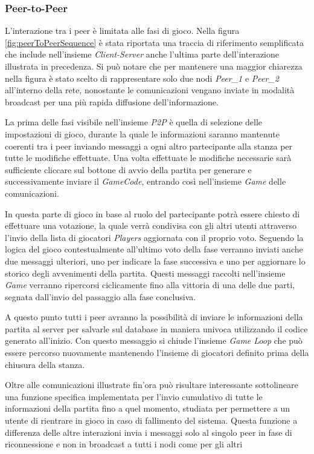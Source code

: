 \subsubsection{Peer-to-Peer}
L'interazione tra i peer è limitata alle fasi di gioco. Nella figura \ref{fig:peerToPeerSequence} è stata riportata una traccia di riferimento semplificata che include nell'insieme \emph{Client-Server} anche l'ultima parte dell'interazione illustrata in precedenza. Si può notare che per mantenere una maggior chiarezza nella figura è stato scelto di rappresentare solo due nodi \emph{Peer\_1} e \emph{Peer\_2} all'interno della rete, nonostante le comunicazioni vengano inviate in modalità broadcast per una più rapida diffusione dell'informazione.

 La prima delle fasi visibile nell'insieme \emph{P2P} è quella di selezione delle impostazioni di gioco, durante la quale le informazioni saranno mantenute coerenti tra i peer inviando messaggi a ogni altro partecipante alla stanza per tutte le modifiche effettuate. Una volta effettuate le modifiche necessarie sarà sufficiente cliccare sul bottone di avvio della partita per generare e successivamente inviare il \emph{GameCode}, entrando così nell'insieme \emph{Game} delle comunicazioni.

 In questa parte di gioco in base al ruolo del partecipante potrà essere chiesto di effettuare una votazione, la quale verrà condivisa con gli altri utenti attraverso l'invio della lista di giocatori \emph{Players} aggiornata con il proprio voto. Seguendo la logica del gioco contestualmente all'ultimo voto della fase verranno inviati anche due messaggi ulteriori, uno per indicare la fase successiva e uno per aggiornare lo storico degli avvenimenti della partita. Questi messaggi raccolti nell'insieme \emph{Game} verranno ripercorsi ciclicamente fino alla vittoria di una delle due parti, segnata dall'invio del passaggio alla fase conclusiva.

 A questo punto tutti i peer avranno la possibilità di inviare le informazioni della partita al server per salvarle sul database in maniera univoca utilizzando il codice generato all'inizio. 
 Con questo messaggio si chiude l'insieme \emph{Game Loop} che può essere percorso nuovamente mantenendo l'insieme di giocatori definito prima della chiusura della stanza.

 Oltre alle comunicazioni illustrate fin'ora può risultare interessante sottolineare una funzione specifica implementata per l'invio cumulativo di tutte le informazioni della partita fino a quel momento, studiata per permettere a un utente di rientrare in gioco in caso di fallimento del sistema. Questa funzione a differenza delle altre interazioni invia i messaggi solo al singolo peer in fase di riconnessione e non in broadcast a tutti i nodi come per gli altri

